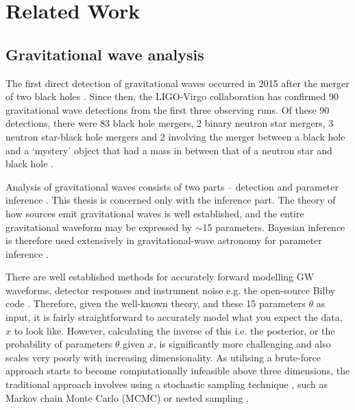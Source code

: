 \section{Related Work}
\label{sec:related_work}

\subsection{Gravitational wave analysis}

The first direct detection of gravitational waves occurred in 2015 after the merger of two black holes \cite{LIGO_2016}. Since then, the LIGO-Virgo collaboration has confirmed 90 gravitational wave detections from the first three observing runs. Of these 90 detections, there were 83 black hole mergers, 2 binary neutron star mergers, 3 neutron star-black hole mergers and 2 involving the merger between a black hole and a `mystery' object that had a mass in between that of a neutron star and black hole \cite{LIGO_FAQ_Website}.

Analysis of gravitational waves consists of two parts -- detection and parameter inference \cite{bhardwaj2023peregrine}. This thesis is concerned only with the inference part. The theory of how sources emit gravitational waves is well established, and the entire gravitational waveform may be expressed by $\sim$15 parameters. Bayesian inference is therefore used extensively in gravitational-wave astronomy for parameter inference \cite{Thrane_Talbot_2019}.

There are well established methods for accurately forward modelling GW waveforms, detector responses and instrument noise \cite{alvey2023things} e.g. the open-source Bilby code \cite{Ashton_Bilby_2019,Romero_Bilby_2020,Ashton_Talbot_Bilby_2021}. Therefore, given the well-known theory, and these 15 parameters $\theta$ as input, it is fairly straightforward to accurately model what you expect the data, $x$ to look like. However, calculating the inverse of this i.e. the posterior, or the probability of parameters $\theta$ given $x$, is significantly more challenging and also scales very poorly with increasing dimensionality. As utilising a brute-force approach starts to become computationally infeasible above three dimensions, the traditional approach involves using a stochastic sampling technique \cite{Thrane_Talbot_2019}, such as Markov chain Monte Carlo (MCMC) \cite{Metropolis_1953,Hastings_1970} or nested sampling \cite{Skilling_2004}.

